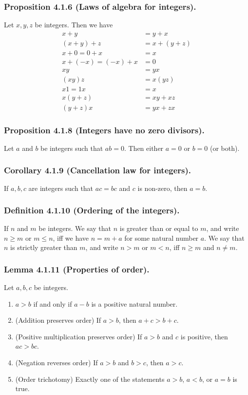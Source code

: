 \documentclass[12pt, letter]{article}
\begin{document}
\subsubsection*{Proposition 4.1.6 (Laws of algebra for integers).}
Let $x,y,z$ be integers. Then we have 
\begin{equation*}
    \begin{aligned}
        x+y&=y+x\\
        (x+y)+z&=x+(y+z)\\
        x+0=0+x&=x\\
        x+(-x)=(-x)+x&=0\\
        xy&=yx\\
        (xy)z&=x(yz)\\
        x1=1x&=x\\
        x(y+z)&=xy+xz\\
        (y+z)x&=yx+zx
    \end{aligned}
\end{equation*}
\subsubsection*{Proposition 4.1.8 (Integers have no zero divisors).}
Let $a$ and $b$ be integers such that $ab=0$. Then either $a=0$ or $b=0$ (or both).
\subsubsection*{Corollary 4.1.9 (Cancellation law for integers).}
If $a,b,c$ are integers such that $ac=bc$ and $c$ is non-zero, then $a=b$.
\subsubsection*{Definition 4.1.10 (Ordering of the integers).}
If $n$ and $m$ be integers. We say that $n$ is greater than or equal to $m$, and write $n\geq m$ or $m\leq n$,
iff we have $n=m+a$ for some natural number $a$. We say that $n$ is strictly greater than $m$,
and write $n>m$ or $m<n$, iff $n\geq m$ and $n\ne m$.
\subsubsection*{Lemma 4.1.11 (Properties of order).}
Let $a,b,c$ be integers.
\begin{enumerate}[label=(\alph*)]
    \item $a>b$ if and only if $a-b$ is a positive natural number.
    \item (Addition preserves order) If $a>b$, then $a+c>b+c$.
    \item (Positive multiplication preserves order) If $a>b$ and $c$ is positive, then $ac>bc$.
    \item (Negation reverses order) If $a>b$ and $b>c$, then $a>c$.
    \item (Order trichotomy) Exactly one of the statements $a>b$, $a<b$, or $a=b$ is true.
\end{enumerate}
\end{document}
